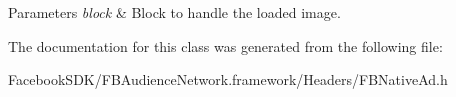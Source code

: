 \begin{DoxyParams}{Parameters}
{\em block} & Block to handle the loaded image. \\
\hline
\end{DoxyParams}


The documentation for this class was generated from the following file\-:\begin{DoxyCompactItemize}
\item 
Facebook\-S\-D\-K/\-F\-B\-Audience\-Network.\-framework/\-Headers/F\-B\-Native\-Ad.\-h\end{DoxyCompactItemize}

